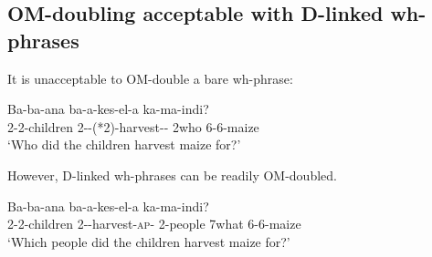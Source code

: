 \documentclass[output=paper]{langscibook}
\begin{document}







\subsection{OM-doubling acceptable with D-linked wh-phrases}

It is unacceptable to OM-double a bare wh-phrase:

\ea 
\gll Ba-ba-ana ba-a-kes-el-a  ka-ma-indi? \\
2-2-children 2\Sm-\Pst-(*2\Om)-harvest-\Appl-\Fv{} 2who 6-6-maize \\
\glt `Who did the children harvest maize for?’ 
\z 

\noindent However, D-linked wh-phrases can be readily OM-doubled. 

\ea 

\gll Ba-ba-ana ba-a-kes-el-a  ka-ma-indi? \\
2-2-children 2\Sm-\Om-harvest-\textsc{ap}-\Fv{} {2-people \hspace{1mm} 7what} 6-6-maize \\
\glt `Which people did the children harvest maize for?’ 

\end{document}
